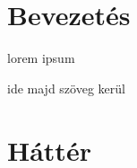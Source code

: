 

\DeclarePairedDelimiter{\norm}{\lVert}{\rVert}



\newcommand{\sumn}[1]{\sum\limits_{{#1}=1}^{n}}


\newcommand{\derivative}[2]{\dfrac{\partial {#1}}{\partial {#2}}}




%
%
%
%





\section{Bevezetés}

lorem ipsum

ide majd szöveg kerül


\newpage
\section{Háttér}



